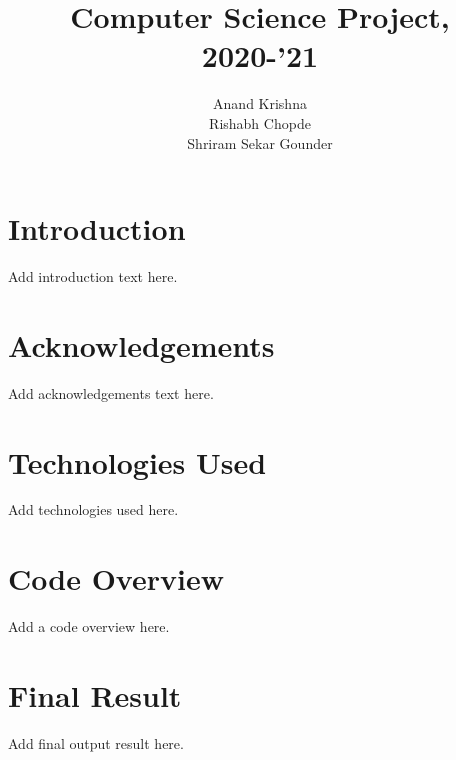 \documentclass[17pt]{extarticle}
\title{\textbf{Computer Science Project, 2020-'21}}
\author{
    Anand Krishna\\
    \And
    Rishabh Chopde\\
    \And
    Shriram Sekar Gounder
    }
\date{\vspace{-5ex}}
\begin{document}
  \maketitle
  \newpage
  \tableofcontents
  
  \newpage
  \section{Introduction}
  Add introduction text here.
  
  \newpage
  \section{Acknowledgements}
  Add acknowledgements text here.
  
  \newpage
  \section{Technologies Used}
  Add technologies used here.
  
  \newpage
  \section{Code Overview}
  Add a code overview here.
  
  \newpage
  \section{Final Result}
  Add final output result here.
  
\end{document}
